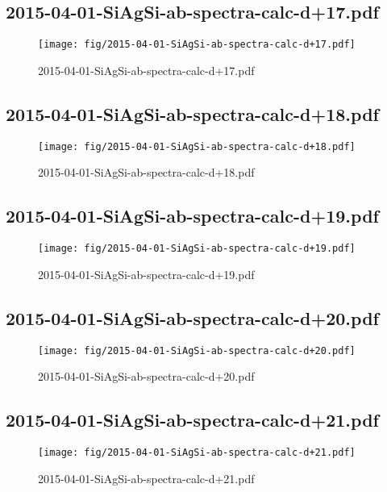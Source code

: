 \documentclass[fullscreen=true]{beamer}
\begin{document}
\subsection{2015-04-01-SiAgSi-ab-spectra-calc-d+17.pdf}
\begin{frame}
  \begin{figure}
    \texttt{[image: fig/2015-04-01-SiAgSi-ab-spectra-calc-d+17.pdf]}%
    \caption{2015-04-01-SiAgSi-ab-spectra-calc-d+17.pdf}
  \end{figure}
\end{frame}

\subsection{2015-04-01-SiAgSi-ab-spectra-calc-d+18.pdf}
\begin{frame}
  \begin{figure}
    \texttt{[image: fig/2015-04-01-SiAgSi-ab-spectra-calc-d+18.pdf]}%
    \caption{2015-04-01-SiAgSi-ab-spectra-calc-d+18.pdf}
  \end{figure}
\end{frame}

\subsection{2015-04-01-SiAgSi-ab-spectra-calc-d+19.pdf}
\begin{frame}
  \begin{figure}
    \texttt{[image: fig/2015-04-01-SiAgSi-ab-spectra-calc-d+19.pdf]}%
    \caption{2015-04-01-SiAgSi-ab-spectra-calc-d+19.pdf}
  \end{figure}
\end{frame}

\subsection{2015-04-01-SiAgSi-ab-spectra-calc-d+20.pdf}
\begin{frame}
  \begin{figure}
    \texttt{[image: fig/2015-04-01-SiAgSi-ab-spectra-calc-d+20.pdf]}%
    \caption{2015-04-01-SiAgSi-ab-spectra-calc-d+20.pdf}
  \end{figure}
\end{frame}

\subsection{2015-04-01-SiAgSi-ab-spectra-calc-d+21.pdf}
\begin{frame}
  \begin{figure}
    \texttt{[image: fig/2015-04-01-SiAgSi-ab-spectra-calc-d+21.pdf]}%
    \caption{2015-04-01-SiAgSi-ab-spectra-calc-d+21.pdf}
  \end{figure}
\end{frame}
\end{document}
